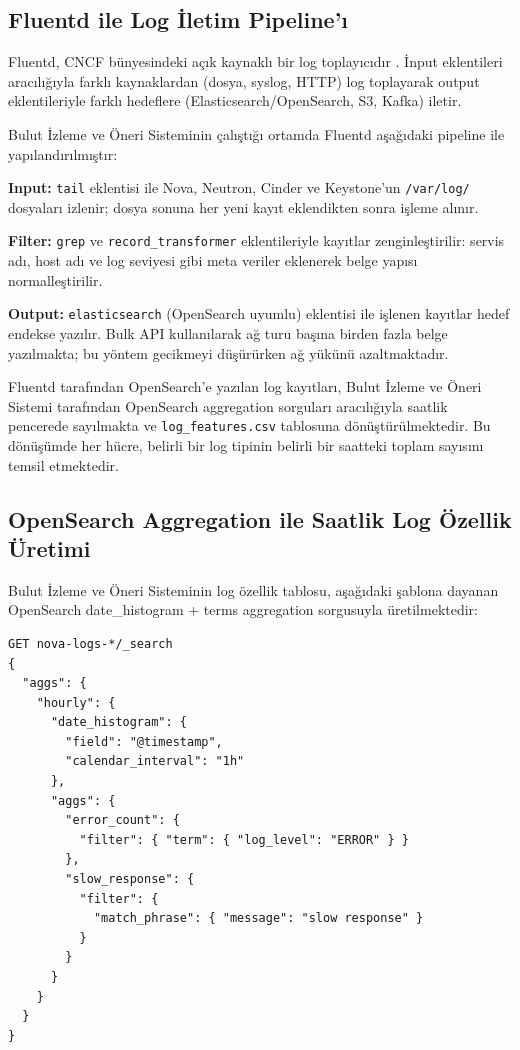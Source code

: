 \subsection{Fluentd ile Log İletim Pipeline'ı}

Fluentd, CNCF bünyesindeki açık kaynaklı bir log toplayıcıdır \autocite{fluentd2024}.
İnput eklentileri aracılığıyla farklı kaynaklardan (dosya, syslog, HTTP) log toplayarak output eklentileriyle farklı hedeflere (Elasticsearch/OpenSearch, S3, Kafka) iletir.

Bulut İzleme ve Öneri Sisteminin çalıştığı ortamda Fluentd aşağıdaki pipeline ile yapılandırılmıştır:

\begin{maddelendir}[label=\arabic*.]
    \item \textbf{Input:} \texttt{tail} eklentisi ile Nova, Neutron, Cinder ve Keystone'un \texttt{/var/log/} dosyaları izlenir; dosya sonuna her yeni kayıt eklendikten sonra işleme alınır.
    \item \textbf{Filter:} \texttt{grep} ve \texttt{record\_transformer} eklentileriyle kayıtlar zenginleştirilir: servis adı, host adı ve log seviyesi gibi meta veriler eklenerek belge yapısı normalleştirilir.
    \item \textbf{Output:} \texttt{elasticsearch} (OpenSearch uyumlu) eklentisi ile işlenen kayıtlar hedef endekse yazılır.
    Bulk API kullanılarak ağ turu başına birden fazla belge yazılmakta; bu yöntem gecikmeyi düşürürken ağ yükünü azaltmaktadır.
\end{maddelendir}

Fluentd tarafından OpenSearch'e yazılan log kayıtları, Bulut İzleme ve Öneri Sistemi tarafından OpenSearch aggregation sorguları aracılığıyla saatlik pencerede sayılmakta ve \texttt{log\_features.csv} tablosuna dönüştürülmektedir.
Bu dönüşümde her hücre, belirli bir log tipinin belirli bir saatteki toplam sayısını temsil etmektedir.

\subsection{OpenSearch Aggregation ile Saatlik Log Özellik Üretimi}

Bulut İzleme ve Öneri Sisteminin log özellik tablosu, aşağıdaki şablona dayanan OpenSearch date\_histogram + terms aggregation sorgusuyla üretilmektedir:

\begin{verbatim}
GET nova-logs-*/_search
{
  "aggs": {
    "hourly": {
      "date_histogram": {
        "field": "@timestamp",
        "calendar_interval": "1h"
      },
      "aggs": {
        "error_count": {
          "filter": { "term": { "log_level": "ERROR" } }
        },
        "slow_response": {
          "filter": {
            "match_phrase": { "message": "slow response" }
          }
        }
      }
    }
  }
}
\end{verbatim}

